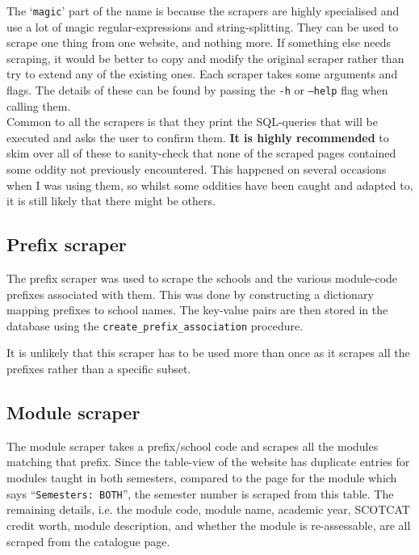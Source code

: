 The `\texttt{magic}' part of the name is because the scrapers are highly
specialised and use a lot of magic regular-expressions and string-splitting.
They can be used to scrape one thing from one website, and nothing more. If
something else needs scraping, it would be better to copy and modify the
original scraper rather than try to extend any of the existing ones. Each
scraper takes some arguments and flags. The details of these can be found by
passing the \texttt{-h} or \texttt{--help} flag when calling them.
\\

Common to all the scrapers is that they print the SQL-queries that will be
executed and asks the user to confirm them. \textbf{It is highly recommended} to
skim over all of these to sanity-check that none of the scraped pages contained
some oddity not previously encountered. This happened on several occasions when
I was using them, so whilst some oddities have been caught and adapted to, it is
still likely that there might be others.

    \subsection{Prefix scraper}
    The prefix scraper was used to scrape the schools and the various
    module-code prefixes associated with them. This was done by constructing a
    dictionary mapping prefixes to school names. The key-value pairs are then
    stored in the database using the \texttt{create\_prefix\_association}
    procedure.
    
    It is unlikely that this scraper has to be used more than once as it scrapes
    all the prefixes rather than a specific subset.

    \subsection{Module scraper}
    The module scraper takes a prefix/school code and scrapes all the modules
    matching that prefix. Since the table-view of the website has duplicate
    entries for modules taught in both semesters, compared to the page for the
    module which says ``\texttt{Semesters: BOTH}'', the semester number is
    scraped from this table. The remaining details, i.e. the module code,
    module name, academic year, SCOTCAT credit worth, module description, and
    whether the module is re-assessable, are all scraped from the catalogue
    page.
    \\
    
